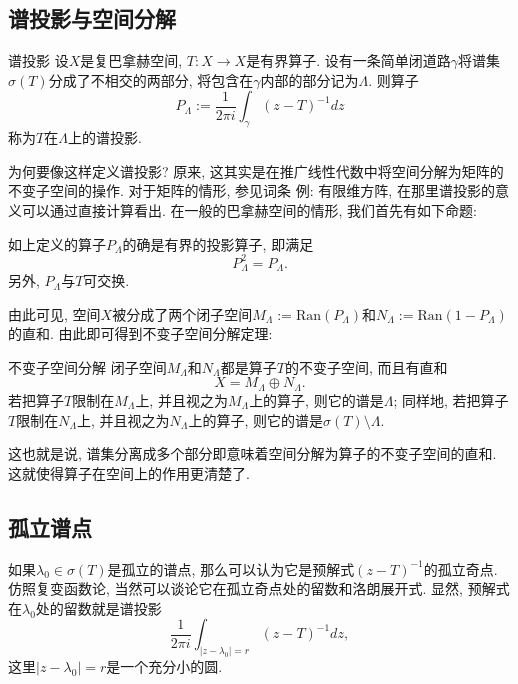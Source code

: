 

\subsection{谱投影与空间分解}
\begin{definition}{谱投影}
设$X$是复巴拿赫空间, $T:X\to X$是有界算子. 设有一条简单闭道路$\gamma$将谱集$\sigma(T)$分成了不相交的两部分, 将包含在$\gamma$内部的部分记为$\Lambda$. 则算子
$$
P_\Lambda:=\frac{1}{2\pi i}\int_\gamma(z-T)^{-1}dz
$$
称为$T$在$\Lambda$上的谱投影.
\end{definition}

为何要像这样定义谱投影? 原来, 这其实是在推广线性代数中将空间分解为矩阵的不变子空间的操作. 对于矩阵的情形, 参见词条 例: 有限维方阵, 在那里谱投影的意义可以通过直接计算看出. 在一般的巴拿赫空间的情形, 我们首先有如下命题:

\begin{lemma}{}
如上定义的算子$P_\Lambda$的确是有界的投影算子, 即满足
$$
P_\Lambda^2=P_\Lambda.
$$
另外, $P_\Lambda$与$T$可交换.
\end{lemma}

由此可见, 空间$X$被分成了两个闭子空间$M_\Lambda:=\text{Ran}(P_\Lambda)$和$N_\Lambda:=\text{Ran}(1-P_\Lambda)$的直和. 由此即可得到不变子空间分解定理:

\begin{theorem}{不变子空间分解}
闭子空间$M_\Lambda$和$N_\Lambda$都是算子$T$的不变子空间, 而且有直和
$$
X=M_\Lambda\oplus N_\Lambda.
$$
若把算子$T$限制在$M_\Lambda$上, 并且视之为$M_\Lambda$上的算子, 则它的谱是$\Lambda$; 同样地, 若把算子$T$限制在$N_\Lambda$上, 并且视之为$N_\Lambda$上的算子, 则它的谱是$\sigma(T)\setminus\Lambda$.
\end{theorem}

这也就是说, 谱集分离成多个部分即意味着空间分解为算子的不变子空间的直和. 这就使得算子在空间上的作用更清楚了.

\subsection{孤立谱点}
如果$\lambda_0\in\sigma(T)$是孤立的谱点, 那么可以认为它是预解式$(z-T)^{-1}$的孤立奇点. 仿照复变函数论, 当然可以谈论它在孤立奇点处的留数和洛朗展开式. 显然, 预解式在$\lambda_0$处的留数就是谱投影
$$
\frac{1}{2\pi i}\int_{|z-\lambda_0|=r}(z-T)^{-1}dz,
$$
这里$|z-\lambda_0|=r$是一个充分小的圆.